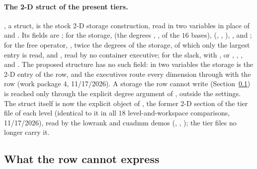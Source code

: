 \paragraph{The 2-D struct of the present tiers.} , a struct, is the stock 2-D storage construction, read in two variables in place of  and . Its fields are ; for the storage,  (the degrees , ,  of the $16$ bases),  (, , ), ,  and ; for the free operator, , twice the degrees of the storage, of which only the largest entry is read, and , read by no container executive; for the  slack,  with , or , , ,  and . The proposed structure has no such field: in two variables the storage is the 2-D entry of the row, and the executives route every dimension through  with the row (work package 4, 11/17/2026). A storage the row cannot write (Section~\ref{sec:cannot}) is reached only through the explicit degree argument of , outside the settings. The struct itself is now the explicit object  of , the former 2-D section of the tier file of each level (identical to it in all $18$ level-and-workspace comparisons, 11/17/2026), read by the lowrank and cuadmm demos (, , ); the tier files no longer carry it.

\subsection{What the row cannot express}\label{sec:cannot}


